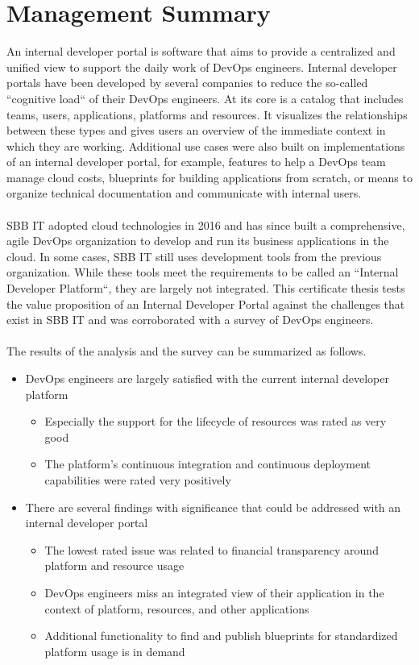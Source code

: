 \documentclass[a4paper,12pt]{article}
\begin{document}
    \section*{Management Summary}
    An internal developer portal is software that aims to provide a centralized and unified view to support the daily
    work of DevOps engineers.
    Internal developer portals have been developed by several companies to reduce the so-called ``cognitive load`` of
    their DevOps engineers.
    At its core is a catalog that includes teams, users, applications, platforms and resources.
    It visualizes the relationships between these types and gives users an overview of the immediate context in
    which they are working.
    Additional use cases were also built on implementations of an internal developer portal, for example, features
    to help a DevOps team manage cloud costs, blueprints for building applications from scratch, or means to organize
    technical documentation and communicate with internal users.\\ \\
    SBB IT adopted cloud technologies in 2016 and has since built a comprehensive, agile DevOps organization to
    develop and run its business applications in the cloud.
    In some cases, SBB IT still uses development tools from the previous organization.
    While these tools meet the requirements to be called an ``Internal Developer Platform``, they are largely not integrated.
    This certificate thesis tests the value proposition of an Internal Developer Portal against the challenges that
    exist in SBB IT and was corroborated with a survey of DevOps engineers.  \\ \\
    The results of the analysis and the survey can be summarized as follows.
    \begin{itemize}
        \item DevOps engineers are largely satisfied with the current internal developer platform
        \begin{itemize}
            \item Especially the support for the lifecycle of resources was rated as very good
            \item The platform's continuous integration and continuous deployment capabilities were rated very positively
        \end{itemize}

        \item There are several findings with significance that could be addressed with an internal developer portal
        \begin{itemize}
            \item The lowest rated issue was related to financial transparency around platform and resource usage
            \item DevOps engineers miss an integrated view of their application in the context of platform, resources, and other applications
            \item Additional functionality to find and publish blueprints for standardized platform usage is in demand
        \end{itemize}
    \end{itemize}
\end{document}
